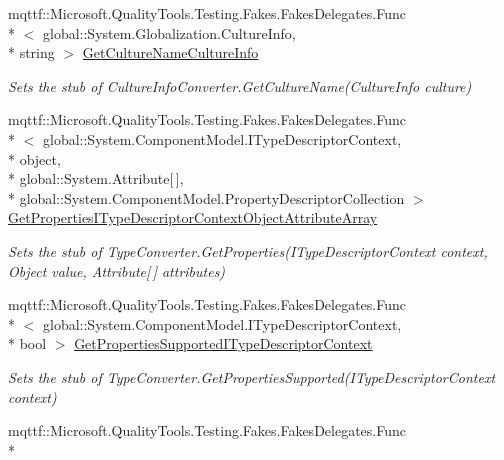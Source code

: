 \begin{DoxyCompactItemize}
mqttf\-::\-Microsoft.\-Quality\-Tools.\-Testing.\-Fakes.\-Fakes\-Delegates.\-Func\\*
$<$ global\-::\-System.\-Globalization.\-Culture\-Info, \\*
string $>$ \hyperlink{class_system_1_1_component_model_1_1_fakes_1_1_stub_culture_info_converter_adb13d263262e7300a7dbb3c192addcee}{Get\-Culture\-Name\-Culture\-Info}
\begin{DoxyCompactList}\small\item\em Sets the stub of Culture\-Info\-Converter.\-Get\-Culture\-Name(\-Culture\-Info culture)\end{DoxyCompactList}\item 
mqttf\-::\-Microsoft.\-Quality\-Tools.\-Testing.\-Fakes.\-Fakes\-Delegates.\-Func\\*
$<$ global\-::\-System.\-Component\-Model.\-I\-Type\-Descriptor\-Context, \\*
object, \\*
global\-::\-System.\-Attribute\mbox{[}$\,$\mbox{]}, \\*
global\-::\-System.\-Component\-Model.\-Property\-Descriptor\-Collection $>$ \hyperlink{class_system_1_1_component_model_1_1_fakes_1_1_stub_culture_info_converter_aca3ed5617c644058ae3344089a3e3bfa}{Get\-Properties\-I\-Type\-Descriptor\-Context\-Object\-Attribute\-Array}
\begin{DoxyCompactList}\small\item\em Sets the stub of Type\-Converter.\-Get\-Properties(\-I\-Type\-Descriptor\-Context context, Object value, Attribute\mbox{[}$\,$\mbox{]} attributes)\end{DoxyCompactList}\item 
mqttf\-::\-Microsoft.\-Quality\-Tools.\-Testing.\-Fakes.\-Fakes\-Delegates.\-Func\\*
$<$ global\-::\-System.\-Component\-Model.\-I\-Type\-Descriptor\-Context, \\*
bool $>$ \hyperlink{class_system_1_1_component_model_1_1_fakes_1_1_stub_culture_info_converter_a3cb2a37f01a624ea16e9e650d80ed8b0}{Get\-Properties\-Supported\-I\-Type\-Descriptor\-Context}
\begin{DoxyCompactList}\small\item\em Sets the stub of Type\-Converter.\-Get\-Properties\-Supported(\-I\-Type\-Descriptor\-Context context)\end{DoxyCompactList}\item 
mqttf\-::\-Microsoft.\-Quality\-Tools.\-Testing.\-Fakes.\-Fakes\-Delegates.\-Func\\*

\end{DoxyCompactItemize}
